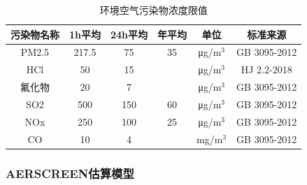 \begin{table}[H]
    \centering
    \caption{环境空气污染物浓度限值}
    \begin{tabular}{cccccc}
        \toprule
        污染物名称 & 1h平均  & 24h平均 & 年平均   & 单位    & 标准来源 \\
        \midrule
        PM2.5 & 217.5\footnotemark & 75   & 35    & μg/m$^3$ & GB 3095-2012 \\
        HCl   & 50    &  15   &       & μg/m$^3$ & HJ 2.2-2018 \\
        氟化物   & 20    & 7     &       & μg/m$^3$ & GB 3095-2012 \\
        SO2   & 500   & 150   & 60    & μg/m$^3$ & GB 3095-2012 \\
        NOx   & 250   & 100   & 25    & μg/m$^3$ & GB 3095-2012 \\
        CO    & 10    & 4     &       & mg/m$^3$ & GB 3095-2012 \\
        \bottomrule
    \end{tabular}
    \label{tab:Ambient air pollutant concentration limits}
\end{table}



\subsubsection{AERSCREEN估算模型}

